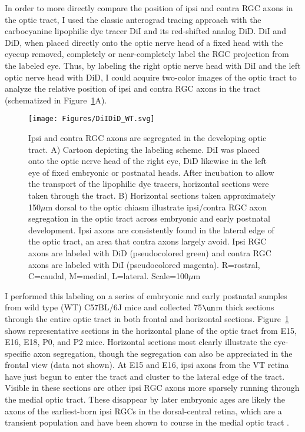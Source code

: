 In order to more directly compare the position of ipsi and contra RGC axons in the optic tract, I used the classic anterograd tracing approach with the carbocyanine lipophilic dye tracer DiI and its red-shifted analog DiD.
DiI and DiD, when placed directly onto the optic nerve head of a fixed head with the eyecup removed, completely or near-completely label the RGC projection from the labeled eye.
Thus, by labeling the right optic nerve head with DiI and the left optic nerve head with DiD, I could acquire two-color images of the optic tract to analyze the relative position of ipsi and contra RGC axons in the tract (schematized in Figure~\ref{Figures/DiIDiD_WT}A).

\begin{figure}[hbtp]
	\begin{center}
		\texttt{[image: Figures/DiIDiD\_WT.svg]}
		\caption[Ipsi and contra RGC axons are segregated in the developing optic tract.]
		{Ipsi and contra RGC axons are segregated in the developing optic tract.
		A) Cartoon depicting the labeling scheme.
		DiI was placed onto the optic nerve head of the right eye, DiD likewise in the left eye of fixed embryonic or postnatal heads.
		After incubation to allow the transport of the lipophilic dye tracers, horizontal sections were taken through the tract.
		B) Horizontal sections taken approximately 150$\mu$m dorsal to the optic chiasm illustrate ipsi/contra RGC axon segregation in the optic tract across embryonic and early postnatal development.
		Ipsi axons are consistently found in the lateral edge of the optic tract, an area that contra axons largely avoid.
		Ipsi RGC axons are labeled with DiD (pseudocolored green) and contra RGC axons are labeled with DiI (pseudocolored magenta).
		R=rostral, C=caudal, M=medial, L=lateral. Scale=100$\mu$m}
		\label{Figures/DiIDiD_WT}
	\end{center}
\end{figure}

I performed this labeling on a series of embryonic and early postnatal samples from wild type (WT) C57BL/6J mice and collected 75$\um$m thick sections through the entire optic tract in both frontal and horizontal sections.
Figure~\ref{Figures/DiIDiD_WT} shows representative sections in the horizontal plane of the optic tract from E15, E16, E18, P0, and P2 mice.
Horizontal sections most clearly illustrate the eye-specific axon segregation, though the segregation can also be appreciated in the frontal view (data not shown). %
At E15 and E16, ipsi axons from the VT retina have just begun to enter the tract and cluster to the lateral edge of the tract.
Visible in these sections are other ipsi RGC axons more sparsely running through the medial optic tract.
These disappear by later embryonic ages are likely the axons of the earliest-born ipsi RGCs in the dorsal-central retina, which are a transient population \cite{drager1985birth} and have been shown to course in the medial optic tract \cite{soares2015transient}.

